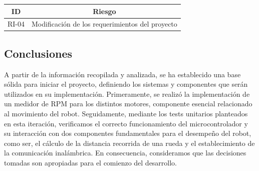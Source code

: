 \begin{center}
    \begin{tabular} {
        | c| c |}
        \hline \rowcolor{test_header_color}
            ID & Riesgo \\
        \hline
            RI-04 & Modificación de los requerimientos del proyecto\\
        \hline
    \end{tabular}
\end{center}

\subsection{Conclusiones}
A partir de la información recopilada y analizada, se ha establecido una base sólida para iniciar el proyecto, definiendo los sistemas y componentes que serán utilizados en su implementación.
Primeramente, se realizó la implementación de un medidor de RPM para los distintos motores, componente esencial relacionado al movimiento del robot. Seguidamente, mediante los tests unitarios planteados en esta iteración, verificamos el correcto funcionamiento del microcontrolador y su interacción con dos componentes fundamentales para el desempeño del robot, como ser, el cálculo de la distancia recorrida de una rueda y el establecimiento de la comunicación inalámbrica.
En consecuencia, consideramos que las decisiones tomadas son apropiadas para el comienzo del desarrollo.